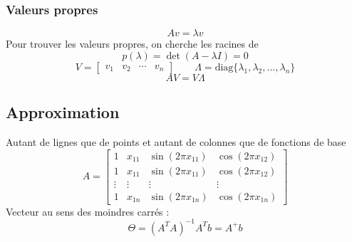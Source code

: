 \documentclass[resume]{subfiles}
\begin{document}
\subsubsection{Valeurs propres}
$$Av=\lambda v$$
Pour trouver les valeurs propres, on cherche les racines de
$$p(\lambda)=\det(A-\lambda I)=0$$
$$V=\begin{bmatrix}
v_1 & v_2 & \cdots & v_n
\end{bmatrix}\qquad \Lambda=\text{diag}\lbrace \lambda_1, \lambda_2, ...,\lambda_n\rbrace$$
$$AV=V\Lambda$$
\subsection{Approximation}
Autant de lignes que de points et autant de colonnes que de fonctions de base
$$A=\begin{bmatrix}
1 & x_{11} & \sin(2\pi x_{11}) & \cos(2\pi x_{12})\\
1 & x_{11} & \sin(2\pi x_{11}) & \cos(2\pi x_{12})\\
\vdots & \vdots & \vdots & \vdots\\
1 & x_{1n} & \sin(2\pi x_{1n}) & \cos(2\pi x_{1n})
\end{bmatrix}$$
Vecteur au sens des moindres carrés :
$$\Theta=(A^{T}A)^{-1}A^{T}b=A^{+}b$$
\end{document}
